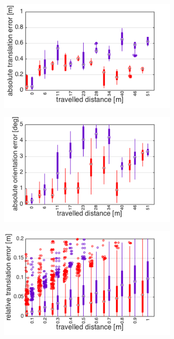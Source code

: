 \begin{figure}[h]
\begin{subfigure}[b]{0.42\textwidth}
    \includegraphics[width=\textwidth]{images/slow/slow_ate.png}
    \caption{}
  \end{subfigure}
  \begin{subfigure}[b]{0.42\textwidth}
    \includegraphics[width=\textwidth]{images/slow/slow_aoe.png}
    \caption{}
  \end{subfigure}
  \hfill
  \begin{subfigure}[b]{0.42\textwidth}
    \includegraphics[width=\textwidth]{images/slow/slow_rte.png}

\end{subfigure}
\end{figure}
